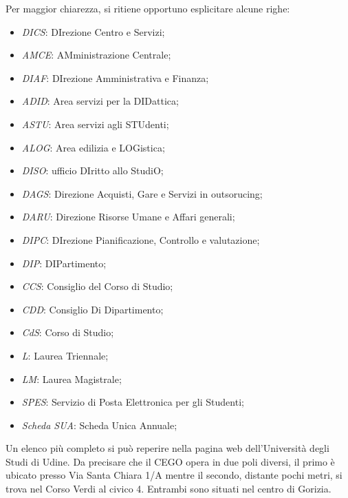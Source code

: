             Per maggior chiarezza, si ritiene opportuno esplicitare alcune righe: 
            \begin{itemize}
                \item \textit{DICS}: DIrezione Centro e Servizi;
                \item \textit{AMCE}: AMministrazione Centrale;
                \item \textit{DIAF}: DIrezione Amministrativa e Finanza;
                \item \textit{ADID}: Area servizi per la DIDattica;
                \item \textit{ASTU}: Area servizi agli STUdenti;
                \item \textit{ALOG}: Area edilizia e LOGistica;
                \item \textit{DISO}: ufficio DIritto allo StudiO;
                \item \textit{DAGS}: Direzione Acquisti, Gare e Servizi in outsorucing;
                \item \textit{DARU}: Direzione Risorse Umane e Affari generali;
                \item \textit{DIPC}: DIrezione Pianificazione, Controllo e valutazione;
                \item \textit{DIP}: DIPartimento; 
                \item \textit{CCS}: Consiglio del Corso di Studio;
                \item \textit{CDD}: Consiglio Di Dipartimento;
                \item \textit{CdS}: Corso di Studio;
                \item \textit{L}: Laurea Triennale; 
                \item \textit{LM}: Laurea Magistrale;
                \item \textit{SPES}: Servizio di Posta Elettronica per gli Studenti;
                \item \textit{Scheda SUA}: Scheda Unica Annuale;
            \end{itemize}
            Un elenco più completo si può reperire nella pagina web \cite{AcronimiSigle} dell'Università degli Studi di Udine. \newline
            Da precisare che il CEGO opera in due poli diversi, il primo è ubicato presso Via Santa Chiara 1/A mentre il secondo, distante pochi metri, si trova nel Corso Verdi al civico 4. Entrambi sono situati nel centro di Gorizia. 
